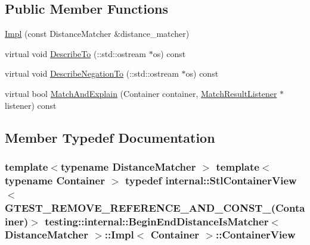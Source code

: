 \subsection*{Public Member Functions}
\begin{DoxyCompactItemize}
\item 
\hyperlink{classtesting_1_1internal_1_1_begin_end_distance_is_matcher_1_1_impl_a92f5afc23d317260d4a5bd091d2904a4}{Impl} (const Distance\+Matcher \&distance\+\_\+matcher)
\item 
virtual void \hyperlink{classtesting_1_1internal_1_1_begin_end_distance_is_matcher_1_1_impl_a623f029822276ab759b312519774e993}{Describe\+To} (\+::std\+::ostream $\ast$os) const 
\item 
virtual void \hyperlink{classtesting_1_1internal_1_1_begin_end_distance_is_matcher_1_1_impl_a7e2a6ddef3dd17a343b8dca9ec93adb7}{Describe\+Negation\+To} (\+::std\+::ostream $\ast$os) const 
\item 
virtual bool \hyperlink{classtesting_1_1internal_1_1_begin_end_distance_is_matcher_1_1_impl_a78763d6532f99d794f7e952076eb8e02}{Match\+And\+Explain} (Container container, \hyperlink{classtesting_1_1_match_result_listener}{Match\+Result\+Listener} $\ast$listener) const 
\end{DoxyCompactItemize}


\subsection{Member Typedef Documentation}
\subsubsection[{\texorpdfstring{Container\+View}{ContainerView}}]{\setlength{\rightskip}{0pt plus 5cm}template$<$typename Distance\+Matcher $>$ template$<$typename Container $>$ typedef {\bf internal\+::\+Stl\+Container\+View}$<$ {\bf G\+T\+E\+S\+T\+\_\+\+R\+E\+M\+O\+V\+E\+\_\+\+R\+E\+F\+E\+R\+E\+N\+C\+E\+\_\+\+A\+N\+D\+\_\+\+C\+O\+N\+S\+T\+\_\+}(Container)$>$ {\bf testing\+::internal\+::\+Begin\+End\+Distance\+Is\+Matcher}$<$ Distance\+Matcher $>$\+::{\bf Impl}$<$ Container $>$\+::{\bf Container\+View}}\hypertarget{classtesting_1_1internal_1_1_begin_end_distance_is_matcher_1_1_impl_a5c76ede38c6143430f56e02e9024f535}{}\label{classtesting_1_1internal_1_1_begin_end_distance_is_matcher_1_1_impl_a5c76ede38c6143430f56e02e9024f535}
